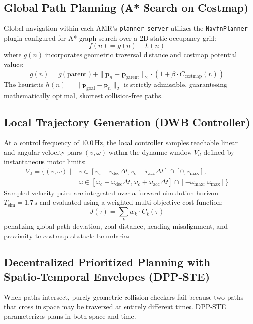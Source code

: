 \documentclass[10pt,twocolumn,a4paper]{article}
\theoremstyle{definition}
\begin{document}
\subsection{Global Path Planning (A* Search on Costmap)}
Global navigation within each AMR's \texttt{planner\_server} utilizes the \texttt{NavfnPlanner} plugin configured for A* graph search over a 2D static occupancy grid:
\begin{equation}
    f(n) = g(n) + h(n)
\end{equation}
where $g(n)$ incorporates geometric traversal distance and costmap potential values:
\begin{equation}
    g(n) = g(\text{parent}) + \|\mathbf{p}_n - \mathbf{p}_{\text{parent}}\|_2 \cdot \left(1 + \beta \cdot C_{\text{costmap}}(n)\right)
\end{equation}
The heuristic $h(n) = \|\mathbf{p}_{\text{goal}} - \mathbf{p}_n\|_2$ is strictly admissible, guaranteeing mathematically optimal, shortest collision-free paths.

\subsection{Local Trajectory Generation (DWB Controller)}
At a control frequency of $10.0\,\text{Hz}$, the local controller samples reachable linear and angular velocity pairs $(v, \omega)$ within the dynamic window $V_d$ defined by instantaneous motor limits:
\begin{align}
    V_d = \Big\{ (v, \omega) \;\Big|\; & v \in [v_c - \dot{v}_{\text{dec}}\Delta t, v_c + \dot{v}_{\text{acc}}\Delta t] \cap [0, v_{\max}], \nonumber \\
    & \omega \in [\omega_c - \dot{\omega}_{\text{dec}}\Delta t, \omega_c + \dot{\omega}_{\text{acc}}\Delta t] \cap [-\omega_{\max}, \omega_{\max}] \Big\}
\end{align}
Sampled velocity pairs are integrated over a forward simulation horizon $T_{\text{sim}} = 1.7\,\text{s}$ and evaluated using a weighted multi-objective cost function:
\begin{equation}
    J(\tau) = \sum_{k} w_k \cdot C_k(\tau)
\end{equation}
penalizing global path deviation, goal distance, heading misalignment, and proximity to costmap obstacle boundaries.

\subsection{Decentralized Prioritized Planning with Spatio-Temporal Envelopes (DPP-STE)}
When paths intersect, purely geometric collision checkers fail because two paths that cross in space may be traversed at entirely different times. DPP-STE parameterizes plans in both space and time.
\end{document}
